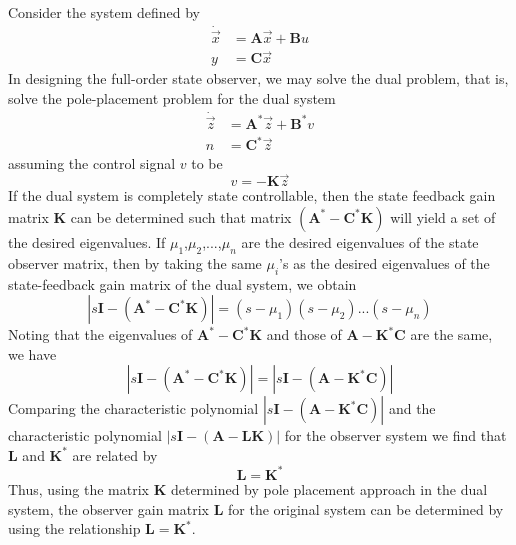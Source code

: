 \documentclass[12pt,a4paper,oneside]{book}
\begin{document}
\begin{onehalfspace}
Consider the system defined by
\begin{equation}\label{duality_eq_1}
	\begin{split}
		\dot{\vec x} & = \mathbf{A}\vec x + \mathbf{B}u \\
		y & = \mathbf{C}\vec x
	\end{split}
\end{equation}
In designing the full-order state observer, we may solve the dual problem, that is, solve the pole-placement problem for the dual system
\begin{equation}\label{duality_eq_2}
	\begin{split}
		\dot{\vec z} & = \mathbf{A}^*\vec z + \mathbf{B}^*v \\
		n & = \mathbf{C}^*\vec z
	\end{split}
\end{equation}
assuming the control signal $v$ to be
\begin{equation}\label{duality_eq_3}
v=-\mathbf{K}\vec z
\end{equation}
If the dual system is completely state controllable, then the state feedback gain matrix $\mathbf{K}$ can be determined such that matrix $(\mathbf{A}^*-\mathbf{C}^*\mathbf{K})$ will yield a set of the desired eigenvalues.
If $\mu_1$,$\mu_2$,$...$,$\mu_n$ are the desired eigenvalues of the state observer matrix, then by taking the same $\mu_i$'s as the desired eigenvalues of the state-feedback gain matrix of the dual system, we obtain
\begin{equation}\label{duality_eq_4}
|s\mathbf{I-(A^* - C^*K)}|= (s-\mu_1)(s-\mu_2)...(s-\mu_n)
\end{equation}
Noting that the eigenvalues of $\mathbf{A}^*-\mathbf{C}^*\mathbf{K}$ and those of $\mathbf{A-K}^*\mathbf{C}$ are the same, we have 
\begin{equation}\label{duality_eq_5}
|s\mathbf{I}-(\mathbf{A}^* - \mathbf{C}^*\mathbf{K})|= |s\mathbf{I}-(\mathbf{A} - \mathbf{K^*C})|
\end{equation}
Comparing the characteristic polynomial $|s\mathbf{I-(A - K^*C)}|$ and the characteristic polynomial $|s\mathbf{I-(A - LK)}|$ for the observer system we find that $\mathbf{L}$ and $\mathbf{K}^*$ are related by
\begin{equation}\label{duality_eq_6}
\mathbf{L=K^*}
\end{equation}
Thus, using the matrix $\mathbf{K}$ determined by pole placement approach in 
the dual system, the observer gain matrix $\mathbf{L}$ for the original system 
can be determined by using the relationship $\mathbf{L=K^*}$.


\end{onehalfspace}
\end{document}
